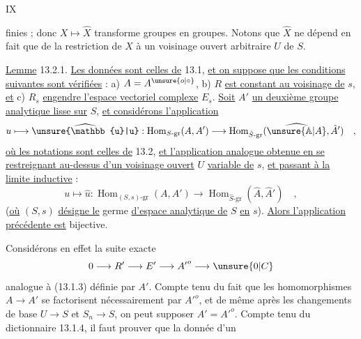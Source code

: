 \makeatletter\tagsleft@true\makeatother{}\hfill IX

finies ; donc $X\longmapsto\hat X$ transforme groupes en groupes. Notons que $\hat X$ ne dépend en fait que de la restriction de $X$ à un voisinage ouvert arbitraire $U$ de $S$.

\uline{Lemme} 13.2.1. \uline{Les données sont celles de} 13.1, \uline{et on suppose que les conditions suivantes sont vérifiées} : a) $A=A^{\unsure{o|\circ}}$, b) $R$ \uline{est constant au voisinage de} $s$, \uline{et} c) $R_s$ \uline{engendre l'espace vectoriel complexe} $E_s$. \uline{Soit} $A'$ \uline{un deuxième groupe analytique lisse sur} $S$, \uline{et considérons l'application}
\[
 u\longmapsto\widehat{\unsure{\mathbb{u}|u}}:\operatorname{Hom}_{S\text{-}\mathrm{gr}}(A,A')\longrightarrow\operatorname{Hom}_{\hat S\text{-}\mathrm{gr}}(\widehat{\unsure{\mathbb A|A}},\hat A')\quad,
\]
\uline{où les notations sont celles de} 13.2, \uline{et l'application analogue obtenue en se restreignant au-dessus d'un voisinage ouvert} $U$ \uline{variable de} $s$, \uline{et passant à la limite inductive} :
\[
 u\longmapsto\hat u:\operatorname{Hom}_{(S,s)\text{-}\mathrm{gr}}(A,A')\longrightarrow\operatorname{Hom}_{\hat S\text{-}\mathrm{gr}}(\hat A,\hat A')\quad,
 \tag*{(13.2.1.1)}
\]
(\uline{où} $(S,s)$ \uline{désigne le} germe \uline{d'espace analytique de} $S$ \uline{en} $s$). \uline{Alors l'application précédente est} bijective.

Considérons en effet la suite exacte
\[
 0\longrightarrow R'\longrightarrow E'\longrightarrow {A'}^{o}\longrightarrow\unsure{0|C}
\]
analogue à (13.1.3) définie par $A'$. Compte tenu du fait que les homomorphismes $A\longrightarrow A'$ se factorisent nécessairement par $ {A'}^{o}$, et de même après les changements de base $U\longrightarrow S$ et $S_n\longrightarrow S$, on peut supposer $A'={A'}^{o}$. Compte tenu du dictionnaire 13.1.4, il faut prouver que la donnée d'un
